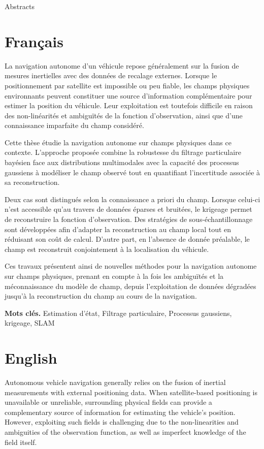 \begin{section_titre}{Abstracts}
	\section*{Français}

	La navigation autonome d'un véhicule repose généralement sur la fusion de mesures inertielles avec des données de recalage externes. Lorsque le positionnement par satellite est impossible ou peu fiable, les champs physiques environnants peuvent constituer une source d'information complémentaire pour estimer la position du véhicule. Leur exploitation est toutefois difficile en raison des non-linéarités et ambiguïtés de la fonction d'observation, ainsi que d'une connaissance imparfaite du champ considéré.

	Cette thèse étudie la navigation autonome sur champs physiques dans ce contexte. L'approche proposée combine la robustesse du filtrage particulaire bayésien face aux distributions multimodales avec la capacité des processus gaussiens à modéliser le champ observé tout en quantifiant l'incertitude associée à sa reconstruction.

	Deux cas sont distingués selon la connaissance a priori du champ. Lorsque celui-ci n'est accessible qu'au travers de données éparses et bruitées, le krigeage permet de reconstruire la fonction d'observation. Des stratégies de sous-échantillonnage sont développées afin d'adapter la reconstruction au champ local tout en réduisant son coût de calcul. D'autre part, en l'absence de donnée préalable, le champ est reconstruit conjointement à la localisation du véhicule.

	Ces travaux présentent ainsi de nouvelles méthodes pour la navigation autonome sur champs physiques, prenant en compte à la fois les ambiguïtés et la méconnaissance du modèle de champ, depuis l'exploitation de données dégradées jusqu'à la reconstruction du champ au cours de la navigation.

	\vspace{\baselineskip}\textbf{Mots clés.} Estimation d'état, Filtrage particulaire, Processus gaussiens, krigeage, SLAM

	\section*{English}

	Autonomous vehicle navigation generally relies on the fusion of inertial measurements with external positioning data. When satellite-based positioning is unavailable or unreliable, surrounding physical fields can provide a complementary source of information for estimating the vehicle's position. However, exploiting such fields is challenging due to the non-linearities and ambiguities of the observation function, as well as imperfect knowledge of the field itself.


\end{section_titre}
